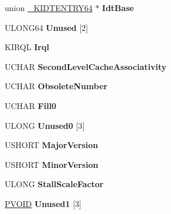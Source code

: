 \begin{DoxyCompactItemize}
\begin{tabbing}
\end{tabbing}\item 
\mbox{\label{struct___k_p_c_r_a4de5e5b42621a636ca2ed616c50105c4}} 
union \hyperlink{union___k_i_d_t_e_n_t_r_y64}{\+\_\+\+K\+I\+D\+T\+E\+N\+T\+R\+Y64} $\ast$ {\bfseries Idt\+Base}
\item 
\mbox{\label{struct___k_p_c_r_a127937515405ec4c57b8aed5af9b9339}} 
U\+L\+O\+N\+G64 {\bfseries Unused} \mbox{[}2\mbox{]}
\item 
\mbox{\label{struct___k_p_c_r_ae402fb9c37c99f317cc91a1155c07b5e}} 
K\+I\+R\+QL {\bfseries Irql}
\item 
\mbox{\label{struct___k_p_c_r_a5e1a25801bf838f05e152bcf1303bf1b}} 
U\+C\+H\+AR {\bfseries Second\+Level\+Cache\+Associativity}
\item 
\mbox{\label{struct___k_p_c_r_ab853b462b03bef073de092ccd7870314}} 
U\+C\+H\+AR {\bfseries Obsolete\+Number}
\item 
\mbox{\label{struct___k_p_c_r_a73c62c951e63dbc8145c1872dca38ca5}} 
U\+C\+H\+AR {\bfseries Fill0}
\item 
\mbox{\label{struct___k_p_c_r_ae31702467edd3e0a756a6e2f408b85bf}} 
U\+L\+O\+NG {\bfseries Unused0} \mbox{[}3\mbox{]}
\item 
\mbox{\label{struct___k_p_c_r_aae8e1e308406e36c03ba4f43efb225f1}} 
U\+S\+H\+O\+RT {\bfseries Major\+Version}
\item 
\mbox{\label{struct___k_p_c_r_a2cbeb3d04c5042e49ad9d63d248da8d0}} 
U\+S\+H\+O\+RT {\bfseries Minor\+Version}
\item 
\mbox{\label{struct___k_p_c_r_a062460f51ee192633a2f4f28649f874d}} 
U\+L\+O\+NG {\bfseries Stall\+Scale\+Factor}
\item 
\mbox{\label{struct___k_p_c_r_a453c9dcf3aa29c3ffd40a7c308641c9b}} 
\hyperlink{interfacevoid}{P\+V\+O\+ID} {\bfseries Unused1} \mbox{[}3\mbox{]}
\item 

\end{DoxyCompactItemize}
